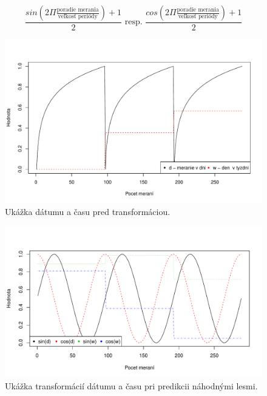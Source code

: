 \documentclass[a4paper,slovak,12pt,appendix]{article}
\begin{document}
\begin{equation}
  \frac{sin(2\Pi \frac{\text{poradie merania}}{\text{veľkosť periódy}}) + 1}{2} \text{  resp.  } \frac{cos(2\Pi \frac{\text{poradie merania}}{\text{veľkosť periódy}}) + 1}{2}
  \label{eq-rf-prepare}
\end{equation}

\begin{figure}[ht]
  \centering
	\vspace{-20pt}
  \includegraphics[width=\textwidth]{random_forest_raw.pdf}
  \caption{Ukážka dátumu a času pred transformáciou.}
  \label{fig-rf-raw}
\end{figure}

\begin{figure}[ht]
  \centering
	\vspace{-20pt}
  \includegraphics[width=\textwidth]{random_forest_preparation.pdf}
  \caption{Ukážka transformácií dátumu a času pri predikcii náhodnými lesmi.}
  \label{fig-rf-prepare}
\end{figure}
\end{document}
